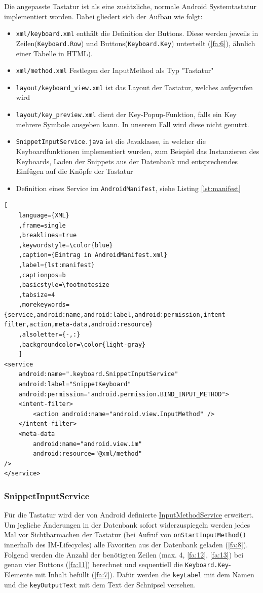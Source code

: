 \documentclass[11pt]{article}
\begin{document}
	\noindent Die angepasste Tastatur ist als eine zusätzliche, normale Android Systemtastatur implementiert worden. Dabei gliedert sich der Aufbau wie folgt: 
	\begin{itemize}
		\item \texttt{xml/keyboard.xml} enthält die Definition der Buttons. Diese werden jeweils in Zeilen(\texttt{Keyboard.Row}) und Buttons(\texttt{Keyboard.Key}) unterteilt (\ref{fa:6}), ähnlich einer Tabelle in HTML).
		\item \texttt{xml/method.xml} Festlegen der InputMethod als Typ "Tastatur"
		\item \texttt{layout/keyboard\_view.xml} ist das Layout der Tastatur, welches aufgerufen wird
		\item \texttt{layout/key\_preview.xml} dient der Key-Popup-Funktion, falls ein Key mehrere Symbole ausgeben kann. In unserem Fall wird diese nicht genutzt.
		\item \texttt{SnippetInputService.java} ist die Javaklasse, in welcher die Keyboardfunktionen implementiert wurden, zum Beispiel das Instanzieren des Keyboards, Laden der Snippets aus der Datenbank und entsprechendes Einfügen auf die Knöpfe der Tastatur
		\item Definition eines Service im \texttt{AndroidManifest}, siehe Listing \ref{lst:manifest} 
	\end{itemize}
	
	\begin{lstlisting}[
	language={XML}
	,frame=single
	,breaklines=true
	,keywordstyle=\color{blue}
	,caption={Eintrag in AndroidManifest.xml}
	,label={lst:manifest}
	,captionpos=b
	,basicstyle=\footnotesize
	,tabsize=4
	,morekeywords={service,android:name,android:label,android:permission,intent-filter,action,meta-data,android:resource}
	,alsoletter={-,:}
	,backgroundcolor=\color{light-gray}
	]
<service
	android:name=".keyboard.SnippetInputService"
	android:label="SnippetKeyboard"
	android:permission="android.permission.BIND_INPUT_METHOD">
	<intent-filter>
		<action android:name="android.view.InputMethod" />
	</intent-filter>
	<meta-data
		android:name="android.view.im"
		android:resource="@xml/method"
/>
</service>
	\end{lstlisting}
	
	\subsubsection{Snippet\-Input\-Service}
	Für die Tastatur wird der von Android definierte \href{https://developer.android.com/guide/topics/text/creating-input-method}{InputMethodService} erweitert.
	Um jegliche Änderungen in der Datenbank sofort widerzuspiegeln werden jedes Mal vor Sichtbarmachen der Tastatur (bei Aufruf von \texttt{onStartInputMethod()} innerhalb des IM-Lifecycles) alle Favoriten aus der Datenbank geladen (\ref{fa:8}). Folgend werden die Anzahl der benötigten Zeilen (max. 4, \ref{fa:12}, \ref{fa:13}) bei genau vier Buttons (\ref{fa:11}) berechnet und sequentiell die \texttt{Keyboard.Key}-Elemente mit Inhalt befüllt (\ref{fa:7}). Dafür werden die \texttt{keyLabel} mit dem Namen und die \texttt{keyOutputText} mit dem Text der Schnipsel versehen.\newline
	
\end{document}
